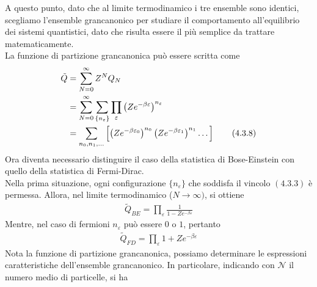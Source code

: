 \documentclass{article}
\begin{document}
A questo punto, dato che al limite termodinamico i tre ensemble sono identici, scegliamo l'ensemble grancanonico per studiare il comportamento all'equilibrio dei sistemi quantistici, dato che risulta essere il più semplice da trattare matematicamente. \\
La funzione di partizione grancanonica può essere scritta come
\begin{align}
    \tilde{Q} &= \sum_{N = 0}^\infty Z^NQ_N \notag \\
    &= \sum_{N = 0}^\infty\sum_{\{n_\varepsilon\}}\prod_\varepsilon \left(Ze^{-\beta\varepsilon}\right)^{n_\varepsilon} \notag \\
    &= \sum_{n_0, n_1, \dots}\left[\left(Ze^{-\beta\varepsilon_0}\right)^{n_0}\left(Ze^{-\beta\varepsilon_1}\right)^{n_1}\dots \right] \tag{4.3.8}
\end{align}
Ora diventa necessario distinguire il caso della statistica di Bose-Einstein con quello della statistica di Fermi-Dirac. \\
Nella prima situazione, ogni configurazione $\{n_\varepsilon\}$ che soddisfa il vincolo $(4.3.3)$ è permessa. Allora, nel limite termodinamico ($N \rightarrow \infty)$, si ottiene 
\begin{align}
    \tilde{Q}_{BE} = \prod_\varepsilon \frac{1}{1 - Ze^{-\beta\varepsilon}} \tag{4.3.9}
\end{align}
Mentre, nel caso di fermioni $n_\varepsilon$ può essere $0$ o $1$, pertanto
\begin{align}
    \tilde{Q}_{FD} = \prod_\varepsilon 1 + Ze^{-\beta\varepsilon} \tag{4.3.10}
\end{align}
Nota la funzione di partizione grancanonica, possiamo determinare le espressioni caratteristiche dell'ensemble grancanonico. In particolare, indicando con $\mathcal{N}$ il numero medio di particelle, si ha
\end{document}
